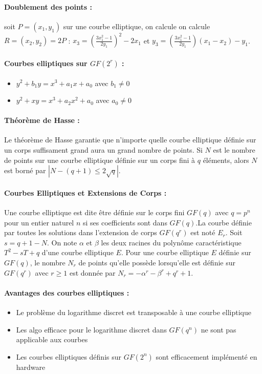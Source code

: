 \documentclass[11pt,a4paper]{report}
\begin{document}
\paragraph*{Doublement des points :} soit $P=(x_1,y_1)$ sur une courbe elliptique, on calcule on calcule $R=(x_2,y_2)=2P$ : $x_3=(\frac{3x^2_1-1}{2y_1})^2-2x_1$ et $y_3=(\frac{3x^2_1-1}{2y_1})(x_1-x_2)-y_1$.

\paragraph*{Courbes elliptiques sur $GF(2^r)$ :} 
\begin{itemize}
    \item $y^2+b_1y=x^3+a_1x+a_0$ avec $b_1\neq0$
    \item $y^2+xy=x^3+a_2x^2+a_0$ avec $a_0\neq0$
\end{itemize}

\paragraph*{Théorème de Hasse :} Le théorème de Hasse garantie que n’importe quelle courbe elliptique définie sur un corps suffisament grand aura un grand nombre de points. Si $N$ est le nombre de points sur une courbe elliptique définie sur un
corps fini à $q$ éléments, alors $N$ est borné par $|N-(q+1)\leq 2\sqrt{q}|$.

\paragraph*{Courbes Elliptiques et Extensions de Corps :} Une courbe elliptique est dite être définie sur le corps fini $GF(q)$ avec $q=p^n$ pour un entier naturel $n$ si ses coefficients sont dans $GF(q)$.La courbe définie par toutes les solutions dans l'extension de corps $GF(q^r)$ est noté $E_r$. Soit $s=q+1-N$. On note $\alpha$ et $\beta$ les deux racines du polynôme caractéristique $T^2-sT+q$ d'une courbe elliptique $E$. Pour une courbe elliptique $E$ définie sur $GF(q)$, le nombre $N_r$ de points qu'elle possède lorsqu'elle est définie sur $GF(q^r)$ avec $r \geq 1$ est donnée par $N_r=-\alpha^r-\beta^r+q^r+1$.

\paragraph*{Avantages des courbes elliptiques :}
\begin{itemize}
    \item Le problème du logarithme discret est transposable à une courbe elliptique
    \item Les algo efficace pour le logarithme discret dans $GF(q^n)$ ne sont pas applicable aux courbes
    \item Les courbes elliptiques définis sur $GF(2^n)$ sont efficacement implémenté en hardware
\end{itemize}
\end{document}
